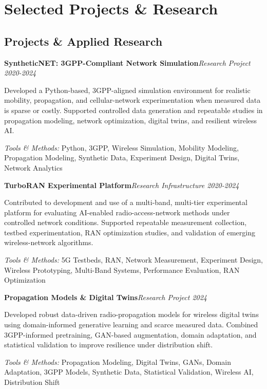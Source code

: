 \documentclass[9pt,letterpaper]{extarticle}
\newcommand{\entry}[2]{\Needspace{4\baselineskip}\textbf{#1}\hfill\textit{#2}\par}
\begin{document}
\section{Selected Projects \& Research}
\subsection{Projects \& Applied Research}
\entry{SyntheticNET: 3GPP-Compliant Network Simulation}{Research Project \textbar{} 2020-2024}
Developed a Python-based, 3GPP-aligned simulation environment for realistic mobility, propagation, and cellular-network experimentation when measured data is sparse or costly. Supported controlled data generation and repeatable studies in propagation modeling, network optimization, digital twins, and resilient wireless AI.\par
{\small\textit{Tools \& Methods:} Python, 3GPP, Wireless Simulation, Mobility Modeling, Propagation Modeling, Synthetic Data, Experiment Design, Digital Twins, Network Analytics\par}
\vspace{1pt}
\entry{TurboRAN Experimental Platform}{Research Infrastructure \textbar{} 2020-2024}
Contributed to development and use of a multi-band, multi-tier experimental platform for evaluating AI-enabled radio-access-network methods under controlled network conditions. Supported repeatable measurement collection, testbed experimentation, RAN optimization studies, and validation of emerging wireless-network algorithms.\par
{\small\textit{Tools \& Methods:} 5G Testbeds, RAN, Network Measurement, Experiment Design, Wireless Prototyping, Multi-Band Systems, Performance Evaluation, RAN Optimization\par}
\vspace{1pt}
\entry{Propagation Models \& Digital Twins}{Research Project \textbar{} 2024}
Developed robust data-driven radio-propagation models for wireless digital twins using domain-informed generative learning and scarce measured data. Combined 3GPP-informed pretraining, GAN-based augmentation, domain adaptation, and statistical validation to improve resilience under distribution shift.\par
{\small\textit{Tools \& Methods:} Propagation Modeling, Digital Twins, GANs, Domain Adaptation, 3GPP Models, Synthetic Data, Statistical Validation, Wireless AI, Distribution Shift\par}
\vspace{1pt}
\end{document}
